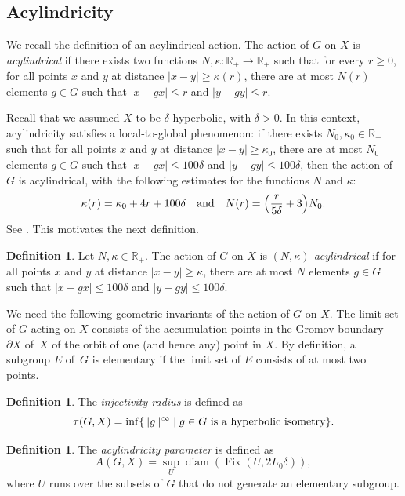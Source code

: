\documentclass[JEP,XML,SOM,Unicode, NoEqCountersInSection,published]{cedram}
\theoremstyle{plain}
\theoremstyle{definition}
\newtheorem{df}[thm]{Definition}
\DeclareMathOperator{\diam}{diam}
\DeclareMathOperator{\Fix}{Fix}
\begin{document}
\subsection{Acylindricity} We recall the definition of an acylindrical action.
The action of $G$ on $X$ is \emph{acylindrical} if there exists two functions $N,\kappa \colon \mathbb R_+ \to \mathbb R_+$ such that for every $r \geq 0$, for all points $x$ and $y$ at distance $|x-y|\geqslant \kappa(r)$, there are at most $N(r)$ elements $g\in G$ such that $|x-gx|\leqslant r$ and $|y-gy|\leqslant r$.

Recall that we assumed $X$ to be $\delta$-hyperbolic, with $\delta > 0$.
In this context, acylindricity satisfies a local-to-global phenomenon: if there exists $N_0,\kappa_0 \in \mathbb R_+$ such that for all points $x$ and $y$ at distance $|x-y|\geqslant \kappa_0$, there are at most $N_0$ elements $g\in G$ such that $|x-gx|\leqslant 100\delta$ and $|y-gy|\leqslant 100\delta$, then the action of $G$ is acylindrical, with the following estimates for the functions $N$ and $\kappa$:
\begin{equation}
\label{eqn: local-global acyl}
\kappa(r) = \kappa_0 + 4r + 100\delta
\quad \text{and} \quad
N(r) = \Bigl( \frac r{5\delta} + 3\Bigr)N_0.
\end{equation}
See \cite[Prop.\,5.31]{dahmani_hyperbolically_2017}.
This motivates the next definition.

\begin{df}\label{D: acylindrical}
Let $N, \kappa \in \mathbb R_+$.
The action of $G$ on $X$ is \emph{$(N,\kappa)$-acylindrical} if for all points $x$ and $y$ at distance $|x-y|\geqslant \kappa$, there are at most $N$ elements $g\in G$ such that $|x-gx|\leqslant 100 \delta$ and $|y-gy|\leqslant 100 \delta$.
\end{df}

We need the following geometric invariants of the action of $G$ on $X$.
The limit set of $G$ acting on $X$ consists of the accumulation points in the Gromov boundary $\partial X$ of~$X$ of the orbit of one (and hence any) point in $X$. By definition, a subgroup $E$ of~$G$ is {elementary} if the limit set of $E$ consists of at most two points.

\begin{df} The \emph{injectivity radius} is defined as
\[
\tau(G,X)=\inf \{\| g \|^{\infty} \mid g \in G \hbox{ is a hyperbolic isometry}\}.
\]
\end{df}

\begin{df} The \emph{acylindricity parameter} is defined as
\[
A(G,X)=\sup_{U} \diam( \Fix(U,2L_0\delta)),
\]
where $U$ runs over the subsets of $G$ that do not generate an elementary subgroup.
\end{df}
\end{document}
